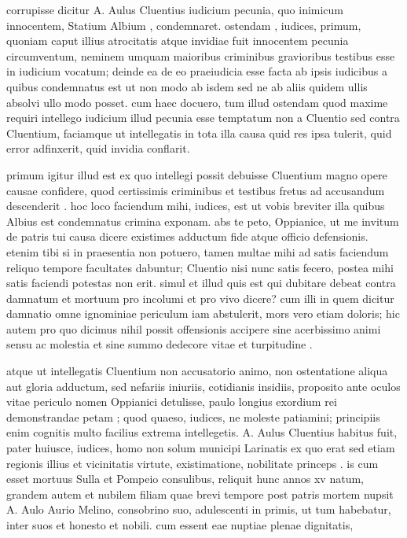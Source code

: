  corrupisse dicitur A. Aulus Cluentius iudicium pecunia, quo inimicum innocentem, Statium Albium , condemnaret. ostendam , iudices, primum, quoniam caput illius atrocitatis atque invidiae fuit innocentem pecunia circumventum, neminem umquam maioribus criminibus gravioribus testibus esse in iudicium vocatum; deinde ea de eo praeiudicia esse facta ab ipsis iudicibus a quibus condemnatus est ut non modo ab isdem sed ne ab aliis quidem ullis absolvi ullo modo posset. cum haec docuero, tum illud ostendam quod maxime requiri intellego iudicium illud pecunia esse temptatum non a Cluentio sed contra Cluentium, faciamque ut intellegatis in tota illa causa quid res ipsa tulerit, quid error adfinxerit, quid invidia conflarit.

 primum igitur illud est ex quo intellegi possit debuisse Cluentium magno opere causae confidere, quod certissimis criminibus et testibus fretus ad accusandum descenderit . hoc loco faciendum mihi, iudices, est ut vobis breviter illa quibus Albius est condemnatus crimina exponam. abs te peto, Oppianice, ut me invitum de patris tui causa dicere existimes adductum fide atque officio defensionis. etenim tibi si in praesentia non potuero, tamen multae mihi ad satis faciendum reliquo tempore facultates dabuntur; Cluentio nisi nunc satis fecero, postea mihi satis faciendi potestas non erit. simul et illud quis est qui dubitare debeat contra damnatum et mortuum pro incolumi et pro vivo dicere? cum illi in quem dicitur damnatio omne ignominiae periculum iam abstulerit, mors vero etiam doloris; hic autem pro quo dicimus nihil possit offensionis accipere sine acerbissimo animi sensu ac molestia et sine summo dedecore vitae et turpitudine .

 atque ut intellegatis Cluentium non accusatorio animo, non ostentatione aliqua aut gloria adductum, sed nefariis iniuriis, cotidianis insidiis, proposito ante oculos vitae periculo nomen Oppianici detulisse, paulo longius exordium rei demonstrandae petam ; quod quaeso, iudices, ne moleste patiamini; principiis enim cognitis multo facilius extrema intellegetis. A. Aulus Cluentius habitus fuit, pater huiusce, iudices, homo non solum municipi Larinatis ex quo erat sed etiam regionis illius et vicinitatis virtute, existimatione, nobilitate princeps . is cum esset mortuus Sulla et Pompeio consulibus, reliquit hunc annos xv natum, grandem autem et nubilem filiam quae brevi tempore post patris mortem nupsit A. Aulo Aurio Melino, consobrino suo, adulescenti in primis, ut tum habebatur, inter suos et honesto et nobili. cum essent eae nuptiae plenae dignitatis,

